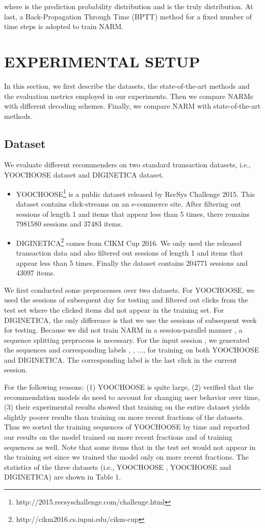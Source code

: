 \documentclass[sigconf]{acmart}
\begin{document}
where  is the prediction probability distribution and  is the truly distribution. At last, a Back-Propagation Through Time (BPTT) method for a fixed number of time steps is adopted to train NARM.

\section{EXPERIMENTAL SETUP}
In this section, we first describe the datasets, the state-of-the-art methods and the evaluation metrics employed in our experiments. Then we compare NARMs with different decoding schemes. Finally, we compare NARM with state-of-the-art methods.

\subsection{Dataset}
We evaluate different recommenders on two standard transaction datasets, i.e., YOOCHOOSE dataset and DIGINETICA dataset.

    \begin{itemize}
  	    \item YOOCHOOSE\footnote{http://2015.recsyschallenge.com/challenge.html} is a public dataset released by RecSys Challenge 2015. This dataset contains click-streams on an e-commerce site. After filtering out sessions of length 1 and items that appear less than 5 times, there remains 7981580 sessions and 37483 items.
  	    \item DIGINETICA\footnote{http://cikm2016.cs.iupui.edu/cikm-cup} comes from CIKM Cup 2016. We only used the released transaction data and also filtered out sessions of length 1 and items that appear less than 5 times. Finally the dataset contains 204771 sessions and 43097 items.
    \end{itemize}

We first conducted some preprocesses over two datasets. For YOOCHOOSE, we used the sessions of subsequent day for testing and filtered out clicks from the test set where the clicked items did not appear in the training set. For DIGINETICA, the only difference is that we use the sessions of subsequent week for testing. Because we did not train NARM in a session-parallel manner \cite{hidasi2015session}, a sequence splitting preprocess is necessary. For the input session , we generated the sequences and corresponding labels , , ...,  for training on both YOOCHOOSE and DIGINETICA. The corresponding label  is the last click in the current session.
  
For the following reasons: (1) YOOCHOOSE is quite large, (2) \citet{tan2016improved} verified that the recommendation models do need to account for changing user behavior over time, (3) their experimental results showed that training on the entire dataset yields slightly poorer results than training on more recent fractions of the datasets. Thus we sorted the training sequences of YOOCHOOSE by time and reported our results on the model trained on more recent fractions  and  of training sequences as well. Note that some items that in the test set would not appear in the training set since we trained the model only on more recent fractions. The statistics of the three datasets (i.e., YOOCHOOSE , YOOCHOOSE  and DIGINETICA) are shown in Table 1.
    
\end{document}
